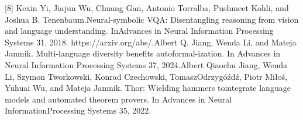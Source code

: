[8] Kexin Yi, Jiajun Wu, Chuang Gan, Antonio Torralba, Pushmeet Kohli, and Joshua B. Tenenbaum.\linebreak[4]
Neural-symbolic VQA: Disentangling reasoning from vision and language understanding. In\linebreak[4]
Advances in Neural Information Processing Systems 31, 2018. https://arxiv.org/abs/.\linebreak[4]
[9] Albert Q. Jiang, Wenda Li, and Mateja Jamnik. Multi-language diversity benefits autoformal-\linebreak[4]
ization. In Advances in Neural Information Processing Systems 37, 2024.\linebreak[4]
[10] Albert Qiaochu Jiang, Wenda Li, Szymon Tworkowski, Konrad Czechowski, Tomasz\linebreak[4]
Odrzyg\'{o}\'{z}d\'{z}, Piotr Mi\l{}o\'{s}, Yuhuai Wu, and Mateja Jamnik. Thor: Wielding hammers to\linebreak[4]
integrate language models and automated theorem provers. In Advances in Neural Information\linebreak[4]
Processing Systems 35, 2022.\par

